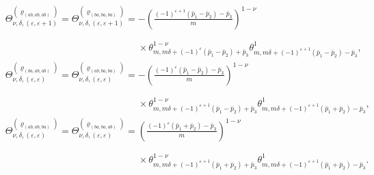 \documentclass[10pt,a4paper]{amsart}
\def\bos{\varrho}
\theoremstyle{definition}
\numberwithin{equation}{section}
\begin{document}
\begin{align*}
& \Theta_{\nu,\delta,(\varepsilon,\varepsilon+1)}^{(\bos_{(ab,ab,ab)})}= \Theta_{\nu,\delta,(\varepsilon,\varepsilon+1)}^{(\bos_{(ba,ba,ba)})} = - \left(\frac{(-1)^{\varepsilon+1}({\bar p_1}-{\bar p_2})-{\bar p_3}}{m}\right)^{1-\nu}\\
&\phantom{ \Theta_{\nu,\delta,(\varepsilon,\varepsilon+1)}^{(\bos_{(ab,ab,ab)})}= \Theta_{\nu,\delta,(\varepsilon,\varepsilon+1)}^{(\bos_{(ba,ba,ba)})} =}{}\times
 \theta^{1-\nu}_{m,m\delta+(-1)^{\varepsilon}(\bar p_1-\bar p_2)+\bar p_3} \theta^1_{m,m\delta+ (-1)^{\varepsilon+1} (\bar p_1-\bar p_2) -\bar p_3}, \\
& \Theta_{\nu,\delta,(\varepsilon,\varepsilon)}^{(\bos_{(ba,ab,ab)})}= \Theta_{\nu,\delta,(\varepsilon,\varepsilon)}^{(\bos_{(ab,ba,ba)})} =- \left(\frac{(-1)^{\varepsilon}({\bar p_1}-{\bar p_2})-{\bar p_3}}{m}\right)^{1-\nu}\\
&\phantom{\Theta_{\nu,\delta,(\varepsilon,\varepsilon)}^{(\bos_{(ba,ab,ab)})}= \Theta_{\nu,\delta,(\varepsilon,\varepsilon)}^{(\bos_{(ab,ba,ba)})} =}{}\times
 \theta^{1-\nu}_{m,m\delta+(-1)^{\varepsilon+1}(\bar p_1-\bar p_2)+ \bar p_3} \theta^1_{m,m\delta+ (-1)^{\varepsilon+1} (\bar p_1+\bar p_2) -\bar p_3},
 \\
& \Theta_{\nu,\delta,(\varepsilon,\varepsilon)}^{(\bos_{(ab,ab,ba)})}= \Theta_{\nu,\delta,(\varepsilon,\varepsilon)}^{(\bos_{(ba,ba,ab)})} = \left(\frac{(-1)^{\varepsilon}({\bar p_1}+{\bar p_2})-{\bar p_3}}{m}\right)^{1-\nu}\\
&\phantom{ \Theta_{\nu,\delta,(\varepsilon,\varepsilon)}^{(\bos_{(ab,ab,ba)})}= \Theta_{\nu,\delta,(\varepsilon,\varepsilon)}^{(\bos_{(ba,ba,ab)})} =}{}\times
 \theta^{1-\nu}_{m,m\delta+(-1)^{\varepsilon+1}(\bar p_1+\bar p_2)+\bar p_3} \theta^1_{m,m\delta+ (-1)^{\varepsilon+1} (\bar p_1+\bar p_2) -\bar p_3} .
\end{align*}
\end{document}

